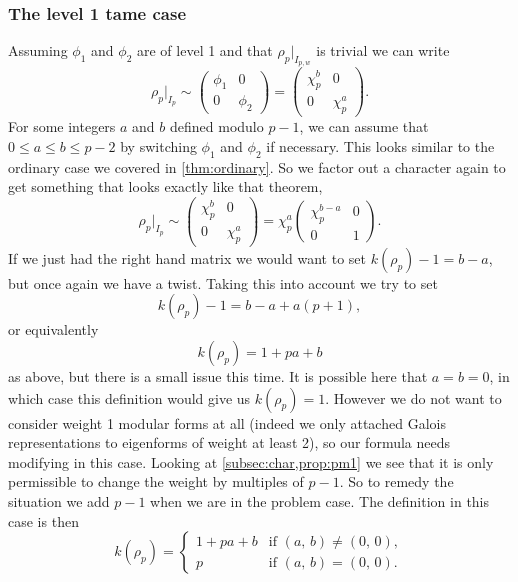 \documentclass[a4paper,12pt]{article}
\begin{document}
\subsubsection{The level 1 tame case}\label{sec:l1t}
Assuming $\phi_1$ and $\phi_2$ are of level 1 and that $\rho_p|_{I_{p,w}}$ is trivial we can write
\[
\rho_p |_{I_p} \sim \begin{pmatrix}
\phi_1 & 0 \\
0      & \phi_2 \end{pmatrix} = \begin{pmatrix}
\chi_p^b & 0 \\
0      & \chi_p^a \end{pmatrix}.
\]
For some integers $a$ and $b$ defined modulo $p-1$, we can assume that $0\le a \le b \le p-2$ by switching $\phi_1$ and $\phi_2$ if necessary.
This looks similar to the ordinary case we covered in \cref{thm:ordinary}.
So we factor out a character again to get something that looks exactly like that theorem,
\[
\rho_p|_{I_p} \sim
\begin{pmatrix}
\chi_p^b & 0 \\
0        & \chi_p^a \end{pmatrix}=
\chi_p^a\begin{pmatrix}
\chi_p^{b-a} & 0 \\
0            & 1 \end{pmatrix}.
\]
If we just had the right hand matrix we would want to set $k(\rho_p) - 1 = b-a$, but once again we have a twist.
Taking this into account we try to set
\[
k(\rho_p) - 1 = b - a + a(p+1),
\]
or equivalently
\[
k(\rho_p) = 1 + pa + b
\]
as above, but there is a small issue this time.
It is possible here that $a = b = 0$, in which case this definition would give us $k(\rho_p) = 1$.
However we do not want to consider weight 1 modular forms at all (indeed we only attached Galois representations to eigenforms of weight at least 2), so our formula needs modifying in this case.
Looking at \cref{subsec:char,prop:pm1} we see that it is only permissible to change the weight by multiples of $p-1$.
So to remedy the situation we add $p-1$ when we are in the problem case.
The definition in this case is then
\begin{equation}\label{eq:l1t}
k(\rho_p) = \begin{cases}
1 + pa + b & \text{if }(a,\,b) \ne (0,\,0), \\
         p & \text{if }(a,\,b) = (0,\,0).
\end{cases}
\end{equation}
\end{document}
